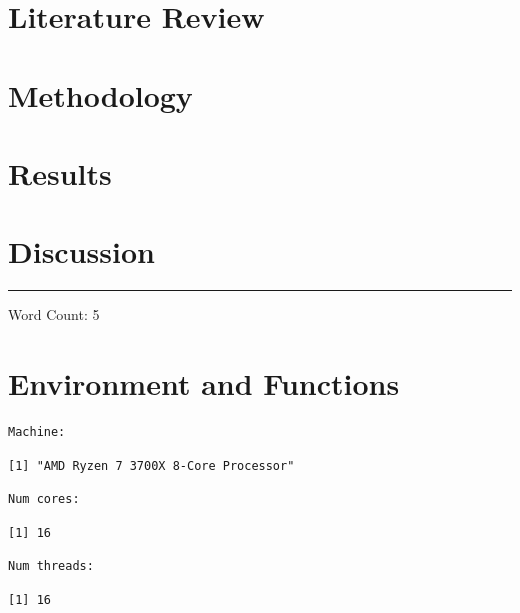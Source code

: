 \documentclass[a4paper, notitlepage]{extreport}
\begin{document}
\chapter{Literature Review}

\lipsum
\chapter{Methodology}

\lipsum
\chapter{Results}

\lipsum
\chapter{Discussion}

\lipsum

\nocite{here,rstudioapi,tidyverse,ggthemes,kableExtra,scales,cowplot,bibtex,benchmarkme,showtext,data.table}
\noindent

\rule{2cm}{0.4pt}

Word Count: 5


\linespread{1}


\appendix
\chapter{Environment and Functions}

\begin{verbatim}
Machine:     
\end{verbatim}

\begin{verbatim}
[1] "AMD Ryzen 7 3700X 8-Core Processor"
\end{verbatim}

\begin{verbatim}
Num cores:   
\end{verbatim}

\begin{verbatim}
[1] 16
\end{verbatim}

\begin{verbatim}
Num threads: 
\end{verbatim}

\begin{verbatim}
[1] 16
\end{verbatim}
\end{document}
